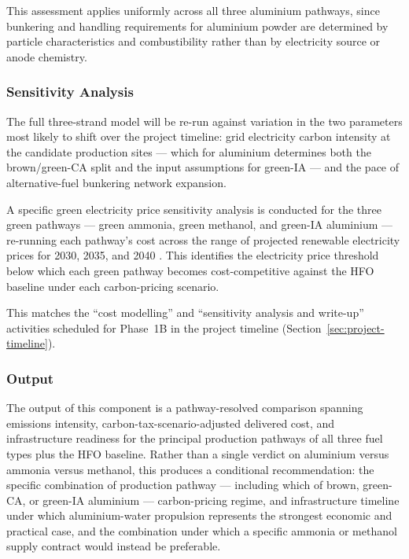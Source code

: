 \documentclass[12pt]{article}
\begin{document}
This assessment applies uniformly across all three aluminium pathways, since 
bunkering and handling requirements for aluminium powder are determined by 
particle characteristics and combustibility rather than by electricity source or 
anode chemistry.

\subsubsection*{Sensitivity Analysis}

The full three-strand model will be re-run against variation in the two 
parameters most likely to shift over the project timeline: grid electricity 
carbon intensity at the candidate production sites --- which for aluminium 
determines both the brown/green-CA split and the input assumptions for green-IA 
\cite{en-pot-basics,en-pot-scaling,dc-aluminium-basic,dc-aluminium-scaling} --- 
and the pace of alternative-fuel bunkering network expansion.

A specific green electricity price sensitivity analysis is conducted for the 
three green pathways --- green ammonia, green methanol, and green-IA aluminium 
--- re-running each pathway's cost across the range of projected renewable 
electricity prices for 2030, 2035, and 2040 
\cite{quebue-hydro-prices,iea-electricity-prices}. This identifies the 
electricity price threshold below which each green pathway becomes 
cost-competitive against the HFO baseline under each carbon-pricing scenario.

This matches the ``cost modelling'' and ``sensitivity analysis and write-up'' 
activities scheduled for Phase~1B in the project timeline 
(Section~\ref{sec:project-timeline}).

\subsubsection*{Output}

The output of this component is a pathway-resolved comparison spanning emissions 
intensity, carbon-tax-scenario-adjusted delivered cost, and infrastructure 
readiness for the principal production pathways of all three fuel types plus the 
HFO baseline. Rather than a single verdict on aluminium versus ammonia versus 
methanol, this produces a conditional recommendation: the specific combination 
of production pathway --- including which of brown, green-CA, or green-IA 
aluminium --- carbon-pricing regime, and infrastructure timeline under which 
aluminium-water propulsion represents the strongest economic and practical case, 
and the combination under which a specific ammonia or methanol supply contract 
would instead be preferable.
\end{document}
